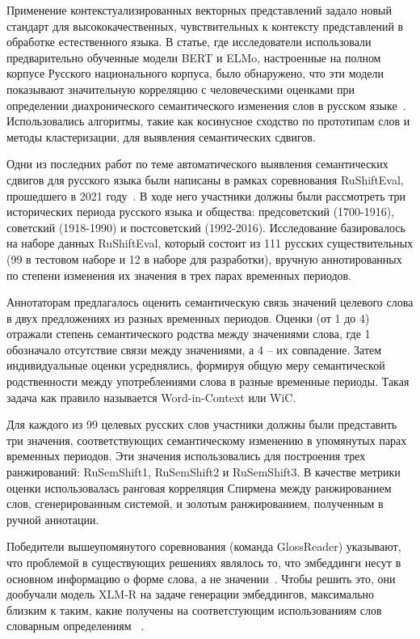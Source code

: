 \documentclass[LI,VKR]{HSEUniversity}
\begin{document}
Применение контекстуализированных векторных представлений задало новый стандарт для
высококачественных, чувствительных к контексту представлений в обработке естественного языка.
В статье, где исследователи использовали предварительно обученные модели BERT и ELMo,
настроенные на полном корпусе Русского национального корпуса, было обнаружено,
что эти модели показывают значительную корреляцию с человеческими оценками
при определении диахронического семантического изменения слов в русском языке~\cite{rodina2020elmo}.
Использовались алгоритмы, такие как косинусное сходство по прототипам слов и методы кластеризации,
для выявления семантических сдвигов.

Одни из последних работ по теме автоматического выявления семантических сдвигов для русского языка
были написаны в рамках соревнования RuShiftEval, прошедшего в 2021 году~\cite{rushifteval}.
В ходе него участники должны были рассмотреть три исторических периода русского языка и общества:
предсоветский (1700-1916), советский (1918-1990) и постсоветский (1992-2016).
Исследование базировалось на наборе данных RuShiftEval, который состоит из
111 русских существительных (99 в тестовом наборе и 12 в наборе для разработки),
вручную аннотированных по степени изменения их значения в трех парах временных периодов.

Аннотаторам предлагалось оценить семантическую связь значений целевого слова в двух предложениях
из разных временных периодов.
Оценки (от 1 до 4) отражали степень семантического родства между значениями слова, где
1 обозначало отсутствие связи между значениями, а 4 – их совпадение.
Затем индивидуальные оценки усреднялись, формируя общую меру семантической родственности между
употреблениями слова в разные временные периоды.
Такая задача как правило называется Word-in-Context или WiC.

Для каждого из 99 целевых русских слов участники должны
были представить три значения, соответствующих семантическому изменению в упомянутых парах
временных периодов.
Эти значения использовались для построения трех ранжирований:
RuSemShift1, RuSemShift2 и RuSemShift3.  %
В качестве метрики оценки использовалась ранговая корреляция Спирмена между ранжированием слов,
сгенерированным системой, и золотым ранжированием, полученным в ручной аннотации.

Победители вышеупомянутого соревнования (команда GlossReader) указывают,
что проблемой в существующих решениях являлось то,
что эмбеддинги несут в основном информацию о форме слова, а не значении~\cite{GlossReader}.
Чтобы решить это, они дообучали модель XLM-R на задаче генерации эмбеддингов, максимально близким
к таким, какие получены на соответстующим использованиям слов словарным определениям
~\cite{XLM-R}.
\end{document}
